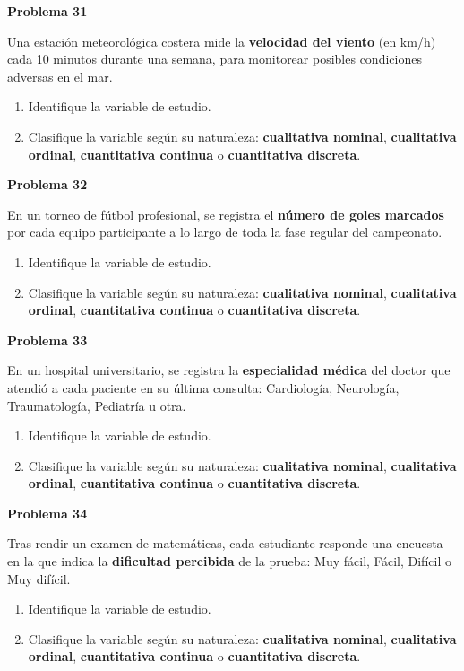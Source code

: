 \documentclass[10pt,letterpaper]{article}
\newcommand{\problema}[1]{%
  \vspace{2pt}%
  \begin{tcolorbox}[
    enhanced,
    colback=white,
    colframe=black,
    arc=0pt,
    boxrule=0pt,
    leftrule=2pt,
    left=6pt, right=6pt,
    top=1pt, bottom=1pt,
  ]
    {\normalsize\bfseries\sffamily #1}
  \end{tcolorbox}%
  \vspace{1pt}%
}
\begin{document}
\problema{Problema 31}
\noindent\sffamily\small Una estaci\'on meteorol\'ogica costera mide la \textbf{velocidad del viento} (en km/h) cada 10 minutos durante una semana, para monitorear posibles condiciones adversas en el mar.
\begin{enumerate}[leftmargin=1.2cm, label=\textbf{\alph*)}, itemsep=0pt, topsep=2pt]
  \item Identifique la variable de estudio.
  \item Clasifique la variable seg\'un su naturaleza: \textbf{cualitativa nominal}, \textbf{cualitativa ordinal}, \textbf{cuantitativa continua} o \textbf{cuantitativa discreta}.
\end{enumerate}

\problema{Problema 32}
\noindent\sffamily\small En un torneo de f\'utbol profesional, se registra el \textbf{n\'umero de goles marcados} por cada equipo participante a lo largo de toda la fase regular del campeonato.
\begin{enumerate}[leftmargin=1.2cm, label=\textbf{\alph*)}, itemsep=0pt, topsep=2pt]
  \item Identifique la variable de estudio.
  \item Clasifique la variable seg\'un su naturaleza: \textbf{cualitativa nominal}, \textbf{cualitativa ordinal}, \textbf{cuantitativa continua} o \textbf{cuantitativa discreta}.
\end{enumerate}

\problema{Problema 33}
\noindent\sffamily\small En un hospital universitario, se registra la \textbf{especialidad m\'edica} del doctor que atendi\'o a cada paciente en su \'ultima consulta: Cardiolog\'ia, Neurolog\'ia, Traumatolog\'ia, Pediatr\'ia u otra.
\begin{enumerate}[leftmargin=1.2cm, label=\textbf{\alph*)}, itemsep=0pt, topsep=2pt]
  \item Identifique la variable de estudio.
  \item Clasifique la variable seg\'un su naturaleza: \textbf{cualitativa nominal}, \textbf{cualitativa ordinal}, \textbf{cuantitativa continua} o \textbf{cuantitativa discreta}.
\end{enumerate}

\problema{Problema 34}
\noindent\sffamily\small Tras rendir un examen de matem\'aticas, cada estudiante responde una encuesta en la que indica la \textbf{dificultad percibida} de la prueba: Muy f\'acil, F\'acil, Dif\'icil o Muy dif\'icil.
\begin{enumerate}[leftmargin=1.2cm, label=\textbf{\alph*)}, itemsep=0pt, topsep=2pt]
  \item Identifique la variable de estudio.
  \item Clasifique la variable seg\'un su naturaleza: \textbf{cualitativa nominal}, \textbf{cualitativa ordinal}, \textbf{cuantitativa continua} o \textbf{cuantitativa discreta}.
\end{enumerate}
\end{document}
